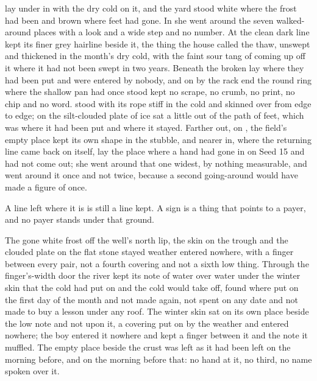  lay under  in  with the dry cold on it, and the yard stood white where the frost had been and brown where feet had gone. In  she went around the seven walked-around places with a look and a wide step and no number. At  the clean dark line kept its finer grey hairline beside it, the thing the house called the thaw, unswept and thickened in the month's dry cold, with the faint sour tang of  coming up off it where it had not been swept in two years. Beneath  the broken  lay where they had been put and were entered by nobody, and on  by the rack end the round ring where the shallow pan had once stood kept no scrape, no crumb, no print, no chip and no word.  stood with its rope stiff in the cold and  skinned over from edge to edge; on  the silt-clouded plate of ice sat a little out of the path of feet, which was where it had been put and where it stayed. Farther out, on , the field's empty place kept its own shape in the stubble, and nearer in, where the returning line came back on itself, lay the place where a hand had gone in on Seed 15 and had not come out; she went around that one widest, by nothing measurable, and went around it once and not twice, because a second going-around would have made a figure of once.

A line left where it is is still a line kept. A sign is a thing that points to a payer, and no payer stands under that ground.

The gone white frost off the well's north lip, the skin on the trough and the clouded plate on the flat stone stayed weather entered nowhere, with a finger between every pair, not a fourth covering and not a sixth low thing. Through the finger's-width door the river kept its note of water over water under the winter skin that the cold had put on and the cold would take off, found where put on the first day of the month and not made again, not spent on any date and not made to buy a lesson under any roof. The winter skin sat on its own place beside the low note and not upon it, a covering put on by the weather and entered nowhere; the boy entered it nowhere and kept a finger between it and the note it muffled. The empty place beside the crust was left as it had been left on the morning before, and on the morning before that: no hand at it, no third, no name spoken over it.

